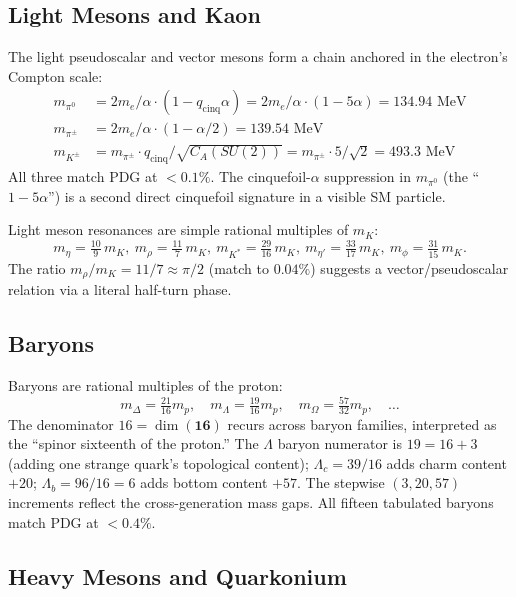 \documentclass[11pt]{article}
\newcommand{\CA}{C_A}
\begin{document}
\subsection{Light Mesons and Kaon}

The light pseudoscalar and vector mesons form a chain anchored in
the electron's Compton scale:
\begin{align}
  m_{\pi^0}  &= 2m_e/\alpha \cdot (1 - q_\text{cinq}\alpha)
              = 2m_e/\alpha \cdot (1 - 5\alpha) = 134.94\text{ MeV}\\
  m_{\pi^\pm} &= 2m_e/\alpha \cdot (1 - \alpha/2) = 139.54\text{ MeV}\\
  m_{K^\pm}  &= m_{\pi^\pm}\cdot q_\text{cinq}/\sqrt{\CA(SU(2))}
              = m_{\pi^\pm}\cdot 5/\sqrt{2} = 493.3\text{ MeV}
\end{align}
All three match PDG at $<0.1\%$.  The cinquefoil-$\alpha$
suppression in $m_{\pi^0}$ (the ``$1-5\alpha$'') is a second
direct cinquefoil signature in a visible SM particle.

Light meson resonances are simple rational multiples of $m_K$:
\begin{equation}
  m_\eta = \tfrac{10}{9}\,m_K,\
  m_\rho = \tfrac{11}{7}\,m_K,\
  m_{K^*} = \tfrac{29}{16}\,m_K,\
  m_{\eta'} = \tfrac{33}{17}\,m_K,\
  m_\phi = \tfrac{31}{15}\,m_K.
\end{equation}
The ratio $m_\rho/m_K = 11/7 \approx \pi/2$ (match to $0.04\%$)
suggests a vector/pseudoscalar relation via a literal half-turn
phase.

\subsection{Baryons}

Baryons are rational multiples of the proton:
\begin{equation}
  m_\Delta = \tfrac{21}{16} m_p, \quad
  m_\Lambda = \tfrac{19}{16} m_p, \quad
  m_\Omega = \tfrac{57}{32} m_p, \quad\ldots
\end{equation}
The denominator $16 = \dim(\mathbf{16})$ recurs across baryon
families, interpreted as the ``spinor sixteenth of the proton.''
The $\Lambda$ baryon numerator is $19 = 16 + 3$ (adding one
strange quark's topological content); $\Lambda_c = 39/16$ adds
charm content $+20$; $\Lambda_b = 96/16 = 6$ adds bottom content
$+57$.  The stepwise $(3, 20, 57)$ increments reflect the
cross-generation mass gaps.  All fifteen tabulated baryons match
PDG at $<0.4\%$.

\subsection{Heavy Mesons and Quarkonium}
\end{document}

